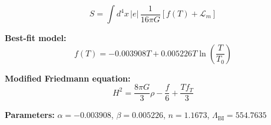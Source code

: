 
\begin{equation}
  S = \int d^4x \, |e| \, \frac{1}{16\pi G} \left[ f(T) + \mathcal{L}_m \right]
\end{equation}

\textbf{Best-fit model:}
\begin{equation}
  f(T) = -0.003908 T + 0.005226 T \ln\!\left(\frac{T}{T_0}\right)
\end{equation}

\textbf{Modified Friedmann equation:}
\begin{equation}
  H^2 = \frac{8\pi G}{3} \rho - \frac{f}{6} + \frac{T f_T}{3}
\end{equation}

\textbf{Parameters:}
$\alpha = -0.003908$, \quad
$\beta = 0.005226$, \quad
$n = 1.1673$, \quad
$\Lambda_{\text{BI}} = 554.7635$